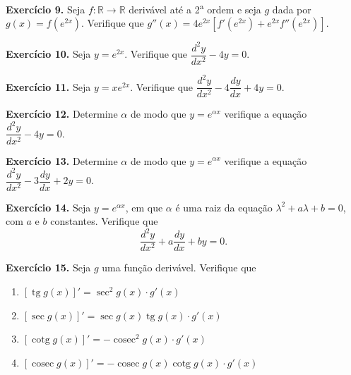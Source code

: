 \documentclass[12pt,a4paper]{article}
\begin{document}
\vspace{0.5cm}
\noindent\textbf{Exercício 9.}
Seja $f\colon \mathbb{R} \to \mathbb{R}$ derivável até a 2\textsuperscript{a} ordem e seja $g$ dada por $g(x) = f(e^{2x})$. Verifique que $g''(x) = 4e^{2x}[f'(e^{2x}) + e^{2x}f''(e^{2x})]$.

\vspace{0.5cm}
\noindent\textbf{Exercício 10.}
Seja $y = e^{2x}$. Verifique que $\dfrac{d^2 y}{dx^2} - 4y = 0$.

\vspace{0.5cm}
\noindent\textbf{Exercício 11.}
Seja $y = xe^{2x}$. Verifique que $\dfrac{d^2 y}{dx^2} - 4\dfrac{dy}{dx} + 4y = 0$.

\vspace{0.5cm}
\noindent\textbf{Exercício 12.}
Determine $\alpha$ de modo que $y = e^{\alpha x}$ verifique a equação $\dfrac{d^2 y}{dx^2} - 4y = 0$.

\vspace{0.5cm}
\noindent\textbf{Exercício 13.}
Determine $\alpha$ de modo que $y = e^{\alpha x}$ verifique a equação $\dfrac{d^2 y}{dx^2} - 3\dfrac{dy}{dx} + 2y = 0$.

\vspace{0.5cm}
\noindent\textbf{Exercício 14.}
Seja $y = e^{\alpha x}$, em que $\alpha$ é uma raiz da equação $\lambda^2 + a\lambda + b = 0$, com $a$ e $b$ constantes. Verifique que
\[
\dfrac{d^2 y}{dx^2} + a\dfrac{dy}{dx} + by = 0.
\]

\vspace{0.5cm}
\noindent\textbf{Exercício 15.} Seja $g$ uma função derivável. Verifique que
\begin{enumerate}
    \renewcommand{\theenumi}{\alph{enumi}}
    \renewcommand{\labelenumi}{\theenumi)}
    \item $[\operatorname{tg} g(x)]' = \sec^2 g(x) \cdot g'(x)$
    \item $[\sec g(x)]' = \sec g(x)\operatorname{tg} g(x) \cdot g'(x)$
    \item $[\operatorname{cotg} g(x)]' = -\operatorname{cosec}^2 g(x) \cdot g'(x)$
    \item $[\operatorname{cosec} g(x)]' = -\operatorname{cosec} g(x)\operatorname{cotg} g(x) \cdot g'(x)$
\end{enumerate}
\end{document}
